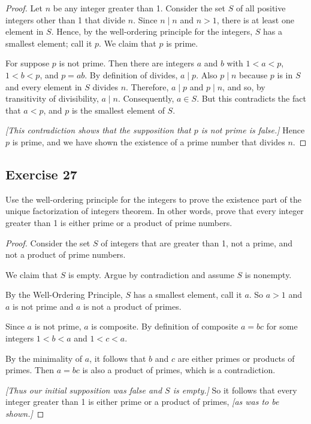 \documentclass[14pt]{extarticle}
\begin{document}
\begin{proof}
Let $n$ be any integer greater than 1. Consider the set $S$ of all positive integers other than 1 that divide $n$. 
Since $n \mid n$ and $n > 1$, there is at least one element in $S$. Hence, by the well-ordering principle for the 
integers, $S$ has a smallest element; call it $p$. We claim that $p$ is prime. 

For suppose $p$ is not prime. Then there are integers $a$ and $b$ with $1 < a < p$, $1 < b < p$, and $p = ab$. By 
definition of divides, $a \mid p$. Also $p \mid n$ because $p$ is in $S$ and every element in $S$ divides $n$. 
Therefore, $a \mid p$ and $p \mid n$, and so, by transitivity of divisibility, $a \mid n$. Consequently, $a 
\in S$. But this contradicts the fact that $a < p$, and $p$ is the smallest element of $S$. 

{\it [This contradiction  shows that the supposition that $p$ is not prime is false.]} Hence $p$ is prime, and we 
have shown the existence of a prime number that divides $n$. 
\end{proof}

\subsection{Exercise 27}
Use the well-ordering principle for the integers to prove the existence part of the unique factorization of integers theorem. In other words, prove that every integer greater than 1 is either prime or a product of prime numbers.

\begin{proof}
Consider the set $S$ of integers that are greater than 1, not a prime, and not a product of prime numbers.

We claim that $S$ is empty. Argue by contradiction and assume $S$ is nonempty.

By the Well-Ordering Principle, $S$ has a smallest element, call it $a$. 
So $a > 1$ and $a$ is not prime and $a$ is not a product of primes.

Since $a$ is not prime, $a$ is composite. 
By definition of composite $a = bc$ for some integers $1 < b < a$ and $1 < c < a$.

By the minimality of $a$, it follows that $b$ and $c$ are either primes or products of primes. Then $a = bc$ is also
a product of primes, which is a contradiction.

{\it [Thus our initial supposition was false and $S$ is empty.]} So it follows that every integer greater than 1 is 
either prime or a product of primes, {\it [as was to be shown.]}
\end{proof}
\end{document}
